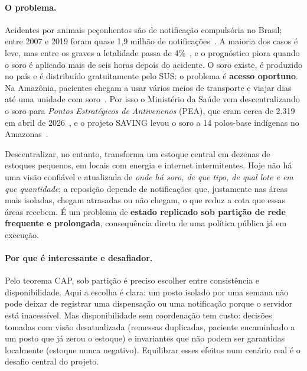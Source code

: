 \documentclass[a4paper,12pt]{article}
\begin{document}
\paragraph{O problema.} Acidentes por animais peçonhentos são de notificação
compulsória no Brasil; entre 2007 e 2019 foram quase 1,9 milhão de
notificações~\cite{completude2023}. A maioria dos casos é leve, mas entre os
graves a letalidade passa de 4\%~\cite{bjihs2023}, e o prognóstico piora
quando o soro é aplicado mais de seis horas depois do acidente. O soro existe,
é produzido no país e é distribuído gratuitamente pelo SUS: o problema é
\textbf{acesso oportuno}. Na Amazônia, pacientes chegam a usar vários meios de
transporte e viajar dias até uma unidade com soro~\cite{monteiro2020}. Por
isso o Ministério da Saúde vem descentralizando o soro para
\emph{Pontos Estratégicos de Antivenenos} (PEA), que eram cerca de 2.319 em
abril de 2026~\cite{nt127}, e o projeto SAVING levou o soro a 14 polos-base
indígenas no Amazonas~\cite{farias2025}.

Descentralizar, no entanto, transforma um estoque central em dezenas de
estoques pequenos, em locais com energia e internet intermitentes. Hoje não
há uma visão confiável e atualizada de \emph{onde há soro, de que tipo, de
qual lote e em que quantidade}; a reposição depende de notificações que,
justamente nas áreas mais isoladas, chegam atrasadas ou não chegam, o que
reduz a cota que essas áreas recebem. É um problema de \textbf{estado
replicado sob partição de rede frequente e prolongada}, consequência direta de
uma política pública já em execução.

\paragraph{Por que é interessante e desafiador.} Pelo teorema CAP, sob
partição é preciso escolher entre consistência e disponibilidade. Aqui a
escolha é clara: um posto isolado por uma semana não pode deixar de registrar
uma dispensação ou uma notificação porque o servidor está inacessível. Mas
disponibilidade sem coordenação tem custo: decisões tomadas com visão
desatualizada (remessas duplicadas, paciente encaminhado a um posto que já
zerou o estoque) e invariantes que não podem ser garantidas localmente
(estoque nunca negativo). Equilibrar esses efeitos num cenário real é o
desafio central do projeto.
\end{document}

